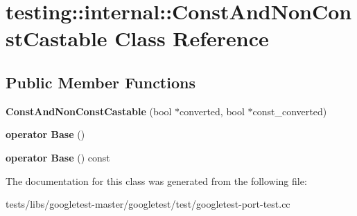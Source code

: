 \hypertarget{classtesting_1_1internal_1_1ConstAndNonConstCastable}{}\section{testing\+:\+:internal\+:\+:Const\+And\+Non\+Const\+Castable Class Reference}
\label{classtesting_1_1internal_1_1ConstAndNonConstCastable}
\subsection*{Public Member Functions}
\begin{DoxyCompactItemize}
\item 
\mbox{\label{classtesting_1_1internal_1_1ConstAndNonConstCastable_aebe0ef6897b7f805e227bb969d4ee034}} 
{\bfseries Const\+And\+Non\+Const\+Castable} (bool $\ast$converted, bool $\ast$const\+\_\+converted)
\item 
\mbox{\label{classtesting_1_1internal_1_1ConstAndNonConstCastable_aff0c372d429d76d002bb29f83f2429fa}} 
{\bfseries operator Base} ()
\item 
\mbox{\label{classtesting_1_1internal_1_1ConstAndNonConstCastable_a4e8ee8051162f1dfc1da294c71481e2f}} 
{\bfseries operator Base} () const
\end{DoxyCompactItemize}


The documentation for this class was generated from the following file\+:\begin{DoxyCompactItemize}
\item 
tests/libs/googletest-\/master/googletest/test/googletest-\/port-\/test.\+cc\end{DoxyCompactItemize}
